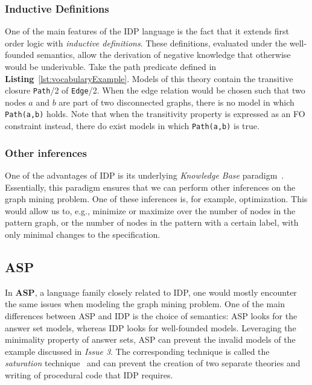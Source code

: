 

\subsubsection{Inductive Definitions}
One of the main features of the IDP language is the fact that it extends first order logic with \emph{inductive definitions}. These definitions, evaluated under the well-founded semantics, allow the derivation of negative knowledge that otherwise would be underivable.
Take the path predicate defined in \textbf{Listing}~\ref{lst:vocabularyExample}.
Models of this theory contain the transitive closure \lstinline|Path|/2 of \lstinline|Edge|/2.
When the edge relation would be chosen such that two nodes $a$ and $b$ are part of two disconnected graphs, there is no model in which \lstinline|Path(a,b)| holds. Note that when the transitivity property is expressed as an FO constraint instead, there do exist models in which \lstinline|Path(a,b)| is true.


\subsubsection{Other inferences}
One of the advantages of IDP is its underlying \emph{Knowledge Base} paradigm~\citep{WarrenBook/DeCatBBD16}.
Essentially, this paradigm ensures that we can perform other inferences on the graph mining problem.
One of these inferences is, for example, optimization.
This would allow us to, e.g., minimize or maximize over the number of nodes in the pattern graph, or the number of nodes in the pattern with a certain label, with only minimal changes to the specification.

\reversemarginpar

\subsection{ASP}
In \textbf{ASP}, a language family closely related to IDP, one would mostly encounter the same issues when modeling the graph mining problem.
One of the main differences between ASP and IDP is the choice of semantics: ASP looks for the
answer set models, whereas IDP looks for well-founded models.
Leveraging the minimality property of answer sets, ASP can prevent the invalid models of the example discussed in \textit{Issue 3}.
The corresponding technique is called the \emph{saturation} technique~\citep{conf/rweb/EiterIK09} and can prevent the creation of two separate theories and writing of procedural code that IDP requires.

